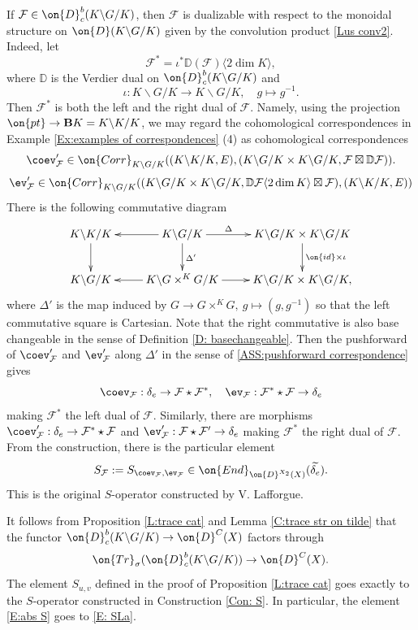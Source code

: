 \documentclass[11pt]{amsart}
\theoremstyle{definition}
\theoremstyle{definition}
\theoremstyle{definition}
\numberwithin{equation}{subsection}
\newcommand{\bD}{{\mathbb D}}
\newcommand{\mF}{{\mathcal F}}
\newcommand{\End}{{\on{End}}}
\newcommand{\id}{{\on{id}}}
\newcommand{\Tr}{{\on{Tr}}}
\begin{document}
If $\mF\in \on{D}_c^b(K\backslash G/K)$, then $\mF$ is dualizable with respect to the monoidal structure on $\on{D}(K\backslash G/K)$ given by the convolution product \eqref{Lus conv2}. Indeed, let
\[\mF^*=\iota^*\bD(\mF)\langle2\dim K\rangle,\]
where $\bD$ is the Verdier dual on $\on{D}_c^b(K\backslash G/K)$ and 
$$\iota: K\backslash G/K\to K\backslash G/K,\quad  g\mapsto g^{-1}.$$ 
Then $\mF^*$ is both the left and the right dual of $\mF$.
Namely, using the projection $\on{pt}\to \mathbf BK=K\backslash K/K$, we may regard the cohomological correspondences in Example \ref{Ex:examples of correspondences} (4) as cohomological correspondences
\[\coev'_{\mF}\in \on{Corr}_{K\backslash G/K}((K\backslash K/K, E), (K\backslash G/K\times K\backslash G/K, \mF\boxtimes \bD \mF)).\]
\[\ev'_{\mF}\in\on{Corr}_{K\backslash G/K}((K\backslash G/K\times K\backslash G/K, \bD\mF\langle2\dim K\rangle\boxtimes \mF), (K\backslash K/K,E)) \]
There is the following commutative diagram
\[
\xymatrix{
K\backslash K/K\ar[d]&\ar[l] K\backslash G/K\ar^-\Delta[r]\ar^{\Delta'}[d]& K\backslash G/K\times K\backslash G/K\ar^{\id\times\iota}[d]\\
K\backslash G/K&\ar[l] K\backslash G\times^KG/K\ar[r]& K\backslash G/K\times K\backslash G/K,
}\]
where $\Delta'$ is the map induced by $G\to G\times^KG,\ g\mapsto (g,g^{-1})$ so that the left commutative square is Cartesian. Note that the right commutative is also base changeable in the sense of Definition \ref{D: basechangeable}.
Then the pushforward of $\coev'_{\mF}$ and $\ev'_\mF$ along $\Delta'$ in the sense of \eqref{ASS:pushforward correspondence} gives
\begin{equation*}
\label{E:unandcoun}
\coev_{\mF}: \delta_e\to \mF\star \mF^*,\quad \ev_{\mF}:\mF^*\star\mF\to \delta_e
\end{equation*}
making $\mF^*$ the left dual of $\mF$. Similarly, there are morphisms $\coev'_{\mF}:\delta_e\to \mF^*\star \mF$ and $\ev'_{\mF}:\mF\star\mF'\to \delta_e$ making $\mF^*$ the right dual of $\mF$. 
From the construction, there is the particular element 
\begin{equation}
\label{E: SLa}
S_{\mF}:=S_{\coev_\mF,\ev_\mF}\in \End_{\on{D}^{X_2}(X)}(\widetilde{\delta_e}).
\end{equation}
This is the original $S$-operator constructed by V. Lafforgue.

It follows from Proposition \ref{L:trace cat} and Lemma \ref{C:trace str on tilde} that the functor $\on{D}_c^b(K\backslash G/K)\to \on{D}^{C}(X)$ factors through
\[
\Tr_\sigma(\on{D}_c^b(K\backslash G/K))\to \on{D}^{C}(X).
\]
The element $S_{u,v}$ defined in the proof of Proposition \ref{L:trace cat} goes exactly to the $S$-operator constructed in Construction \ref{Con: S}. In particular, the element \eqref{E:abs S} goes to \eqref{E: SLa}.
\end{document}
